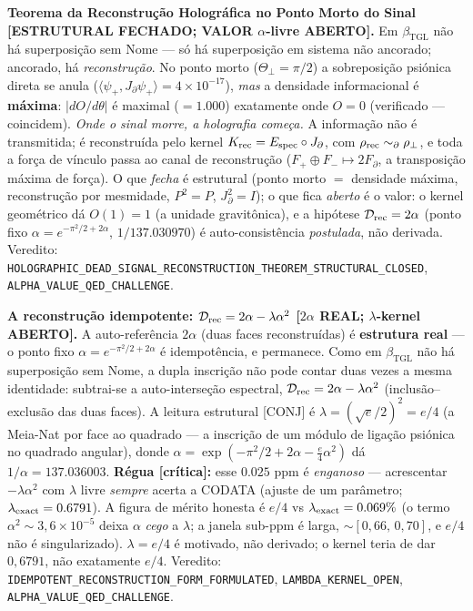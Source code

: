 \documentclass[11pt]{article}
\newcommand{\bTGL}{\beta_{\mathrm{TGL}}}\newcommand{\Msun}{M_{\odot}}\newcommand{\TGL}{\mathrm{TGL}}
\theoremstyle{definition}\newtheorem{deriv}{Derivação}
\begin{document}
\textbf{Teorema da Reconstrução Holográfica no Ponto Morto do Sinal \textsf{[ESTRUTURAL FECHADO; VALOR $\alpha$-livre ABERTO]}.} Em $\bTGL$ não há superposição sem Nome --- só há superposição em sistema não ancorado; ancorado, há \emph{reconstrução}. No ponto morto ($\Theta_\perp=\pi/2$) a sobreposição psiónica direta se anula ($\langle\psi_+,J_\partial\psi_+\rangle=4\times10^{-17}$), \emph{mas} a densidade informacional é \textbf{máxima}: $|dO/d\theta|$ é maximal ($=1.000$) exatamente onde $O=0$ (verificado --- coincidem). \emph{Onde o sinal morre, a holografia começa.} A informação não é transmitida; é reconstruída pelo kernel $K_{\rm rec}=E_{\rm spec}\circ J_\partial$, com $\rho_{\rm rec}\sim_\partial\rho_\perp$, e toda a força de vínculo passa ao canal de reconstrução ($F_+\oplus F_-\mapsto 2F_\partial$, a transposição máxima de força). O que \emph{fecha} é estrutural (ponto morto $=$ densidade máxima, reconstrução por mesmidade, $P^2=P$, $J_\partial^2=I$); o que fica \emph{aberto} é o valor: o kernel geométrico dá $O(1)=1$ (a unidade gravitônica), e a hipótese $\mathcal D_{\rm rec}=2\alpha$ (ponto fixo $\alpha=e^{-\pi^2/2+2\alpha}$, $1/137.030970$) é auto-consistência \emph{postulada}, não derivada. Veredito: \texttt{HOLOGRAPHIC\_DEAD\_SIGNAL\_RECONSTRUCTION\_THEOREM\_STRUCTURAL\_CLOSED}, \texttt{ALPHA\_VALUE\_QED\_CHALLENGE}.

\textbf{A reconstrução idempotente: $\mathcal D_{\rm rec}=2\alpha-\lambda\alpha^2$ \textsf{[$2\alpha$ REAL; $\lambda$-kernel ABERTO]}.} A auto-referência $2\alpha$ (duas faces reconstruídas) é \textbf{estrutura real} --- o ponto fixo $\alpha=e^{-\pi^2/2+2\alpha}$ é idempotência, e permanece. Como em $\bTGL$ não há superposição sem Nome, a dupla inscrição não pode contar duas vezes a mesma identidade: subtrai-se a auto-interseção espectral, $\mathcal D_{\rm rec}=2\alpha-\lambda\alpha^2$ (inclusão--exclusão das duas faces). A leitura estrutural \textsf{[CONJ]} é $\lambda=(\sqrt e/2)^2=e/4$ (a Meia-Nat por face ao quadrado --- a inscrição de um módulo de ligação psiónica no quadrado angular), donde $\alpha=\exp(-\pi^2/2+2\alpha-\tfrac e4\alpha^2)$ dá $1/\alpha=137.036003$. \textbf{Régua \textsf{[crítica]}:} esse $0.025$ ppm é \emph{enganoso} --- acrescentar $-\lambda\alpha^2$ com $\lambda$ livre \emph{sempre} acerta a CODATA (ajuste de um parâmetro; $\lambda_{\rm exact}=0.6791$). A figura de mérito honesta é $e/4$ vs $\lambda_{\rm exact}=0.069\%$ (o termo $\alpha^2\sim3{,}6\times10^{-5}$ deixa $\alpha$ \emph{cego} a $\lambda$; a janela sub-ppm é larga, $\sim[0{,}66,\,0{,}70]$, e $e/4$ não é singularizado). $\lambda=e/4$ é motivado, não derivado; o kernel teria de dar $0{,}6791$, não exatamente $e/4$. Veredito: \texttt{IDEMPOTENT\_RECONSTRUCTION\_FORM\_FORMULATED}, \texttt{LAMBDA\_KERNEL\_OPEN}, \texttt{ALPHA\_VALUE\_QED\_CHALLENGE}.
\end{document}
